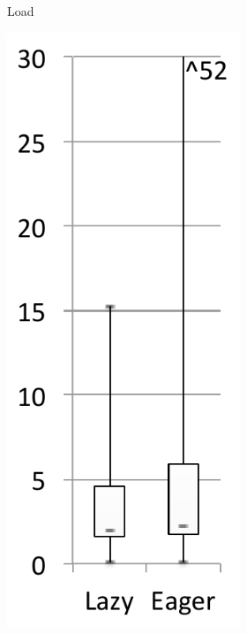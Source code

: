 \documentclass[sigplan,10pt,screen]{acmart}\settopmatter{printfolios=true,printccs=true,printacmref=true}
\begin{document}
\begin{figure}[bth]
\begin{subfigure}[b]{.48\textwidth}
\begin{subfigure}[b]{.24\textwidth}
		\caption{Load}
   	\end{subfigure}%
   	\begin{subfigure}[b]{.24\textwidth}
		\includegraphics[width=\linewidth]{figures/netBeansExp} 

\end{subfigure}
\end{subfigure}
\end{figure}
\end{document}
